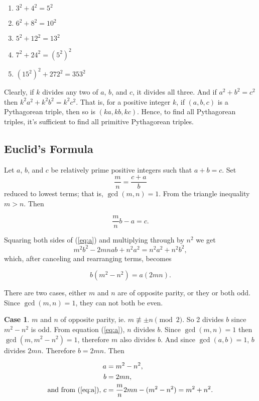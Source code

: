 \documentclass{article}
\theoremstyle{definition}
\newtheorem{case}{Case}[section]
\begin{document}
\begin{enumerate}
\item \(3^2 + 4^2 = 5^2\)
\item \(6^2 + 8^2 = 10^2\)
\item \(5^2 + 12^2 = 13^2\)
\item \(7^2 + 24^2 = (5^2)^2\)
\item \((15^2)^2 + 272^2 = 353^2\)
\end{enumerate}

Clearly, if \(k\) divides any two of \(a\), \(b\), and \(c\), it divides all three. And if  \(a^2 + b^2 = c^2\) then \(k^2a^2 + k^2b^2 = k^2c^2\). That is, for a positive integer \(k\), if \((a,b,c)\) is a Pythagorean triple, then so is \((ka,kb,kc)\). Hence, to find all Pythagorean triples, it's sufficient to find all primitive Pythagorean triples.

\subsection{Euclid's Formula}
\label{sec:Euclid}

Let \(a\), \(b\), and \(c\) be relatively prime positive integers such that \(a + b = c\). Set \[ \frac{m}{n} = \frac{c + a}{b} \] reduced to lowest terms; that is, \(\gcd(m,n) = 1\). From the triangle inequality \(m > n\). Then

\begin{equation}
\frac{m}{n}b - a = c.
\label{eq:a}
\end{equation}

Squaring both sides of (\ref{eq:a}) and multiplying through by \(n^2\) we get \[ m^2b^2 - 2mnab + n^2a^2 = n^2a^2 + n^2b^2,\] which, after canceling and rearranging terms, becomes

\begin{equation}
b(m^2 - n^2) = a(2mn).
\end{equation}

There are two cases, either \(m\) and \(n\) are of opposite parity, or they or both odd. Since \(\gcd(m,n)=1\), they can not both be even.

\begin{case}
\(m\) and \(n\) of opposite parity, ie. \(m\not\equiv \pm n \pmod{2}\). So 2 divides \(b\) since \(m^2 - n^2\) is odd. From equation (\ref{eq:a}), \(n\) divides \(b\). Since \(\gcd(m,n) = 1\) then \(\gcd(m, m^2 - n^2) = 1\), therefore \(m\) also divides \(b\). And since \(\gcd(a, b) = 1\), \(b\) divides \(2mn\). Therefore \(b = 2mn\). Then

\begin{equation}
\begin{aligned}
a &= m^2 - n^2, \\
b &= 2mn, \\
\text{and from (\ref{eq:a}), } c &= \frac{m}{n}2mn - (m^2 - n^2) = m^2 + n^2.
\end{aligned}
\label{eq:EuclidCase1}
\end{equation}
\end{case}
\end{document}
